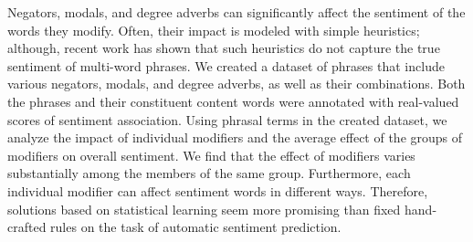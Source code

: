 Negators, modals, and degree adverbs can significantly affect the sentiment of the words they modify. Often, their impact is modeled with simple heuristics; although, recent work has shown that such heuristics do not capture the true sentiment of multi-word phrases. We created a dataset of phrases that include various negators, modals, and degree adverbs, as well as their combinations. Both the phrases and their constituent content words were annotated with real-valued scores of sentiment association. Using phrasal terms in the created dataset, we analyze the impact of individual modifiers and the average effect of the groups of modifiers on overall sentiment. We find that the effect of modifiers varies substantially among the members of the same group. Furthermore, each individual modifier can affect sentiment words in different ways. Therefore, solutions based on statistical learning seem more promising than fixed hand-crafted rules on the task of automatic sentiment prediction.

